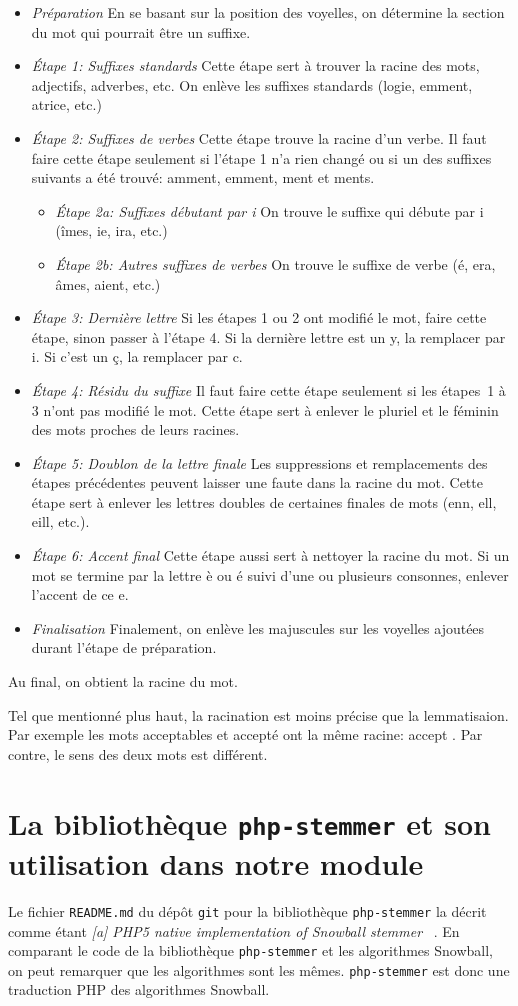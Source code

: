 \newcommand{\ETAPE}[1]{\item{\emph{#1}}}

\begin{itemize}
\ETAPE{Pr\'eparation}
En se basant sur la position des voyelles, on d\'etermine la section du mot qui pourrait \^etre un suffixe.
\ETAPE{\'Etape 1: Suffixes standards}
Cette \'etape sert \`a trouver la racine des mots, adjectifs, adverbes, etc.
On enl\`eve les suffixes standards (logie, emment, atrice, etc.)
\ETAPE{\'Etape 2: Suffixes de verbes}
Cette \'etape trouve la racine d'un verbe.
Il faut faire cette \'etape seulement si l'\'etape 1 n'a rien chang\'e ou si un des suffixes suivants a \'et\'e trouv\'e: amment, emment, ment et ments.
\begin{itemize}
\ETAPE{\'Etape 2a: Suffixes d\'ebutant par i}
On trouve le suffixe qui d\'ebute par i (\^imes, ie, ira, etc.)
\ETAPE{\'Etape 2b: Autres suffixes de verbes}
On trouve le suffixe de verbe (\'e, era, \^ames, aient, etc.)
\end{itemize}
\ETAPE{\'Etape 3: Derni\`ere lettre}
Si les \'etapes 1 ou 2 ont modifi\'e le mot, faire cette \'etape, sinon passer \`a l'\'etape 4.
Si la derni\`ere lettre est un y, la remplacer par i.
Si c'est un \c{c}, la remplacer par c.
\ETAPE{\'Etape 4: R\'esidu du suffixe}
Il faut faire cette \'etape seulement si les \'etapes~1 \`a 3 n'ont pas modifi\'e le mot.
Cette \'etape sert \`a enlever le pluriel et le f\'eminin des mots proches de leurs racines.
\ETAPE{\'Etape 5: Doublon de la lettre finale}
Les suppressions et remplacements des \'etapes pr\'ec\'edentes peuvent laisser une faute dans la racine du mot.
Cette \'etape sert \`a enlever les lettres doubles de certaines finales de mots (enn, ell, eill, etc.).
\ETAPE{\'Etape 6: Accent final}
Cette \'etape aussi sert \`a nettoyer la racine du mot.
Si un mot se termine par la lettre {\`e ou \'e} suivi d'une ou plusieurs consonnes, enlever l'accent de ce {e}.
\ETAPE{Finalisation}
Finalement, on enl\`eve les majuscules sur les voyelles ajout\'ees durant l'\'etape de pr\'eparation.
\end{itemize}
Au final, on obtient la racine du mot.

Tel que mentionn\'e plus haut, la racination est moins pr\'ecise que la lemmatisaion.
Par exemple les mots \og acceptables \fg{} et \og accept\'e \fg{} ont la m\^eme racine: \og accept \fg{}.
Par contre, le sens des deux mots est diff\'erent.


\section{La biblioth\`eque \texttt{php-stemmer} et son utilisation dans notre module}
\label{chap:phpstemmer}
Le fichier \texttt{README.md} du d\'ep\^ot \texttt{git} pour la biblioth\`eque \texttt{php-stemmer} la d\'ecrit comme \'etant \og \textit{[a] PHP5 native implementation of Snowball stemmer} \fg{}~\cite{phpstemmer}.
%
En comparant le code de la biblioth\`eque \texttt{php-stemmer} et les algorithmes Snowball, on peut remarquer que les algorithmes sont les m\^emes.
\texttt{php-stemmer} est donc une traduction PHP des algorithmes Snowball.

